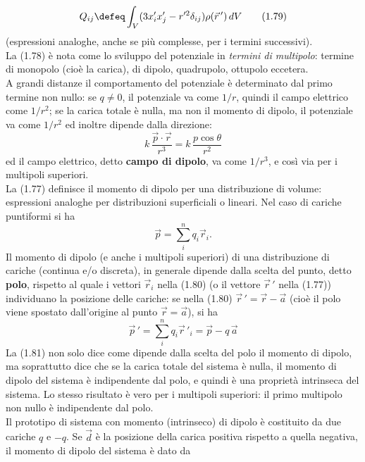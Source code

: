 \begin{equation}
  Q_{ij}\defeq\int_V(3x'_ix'_j-r'^2\delta_{ij})\rho(\vec r\,')\,dV
  \tag{1.79}
\end{equation}
(espressioni analoghe, anche se pi\`u complesse, per i termini successivi).\\
La (1.78) \`e nota come lo sviluppo del potenziale in \emph{termini di
multipolo}: termine di monopolo (cio\`e la carica), di dipolo, quadrupolo,
ottupolo eccetera.\\
A grandi distanze il comportamento del potenziale \`e determinato dal primo
termine non nullo: se $q\neq0$, il potenziale va come $1/r$, quindi il campo
elettrico come $1/r^2$; se la carica totale \`e nulla, ma non il momento di
dipolo, il potenziale va come $1/r^2$ ed inoltre dipende dalla direzione:
\[
  k\,\frac{\vec p\cdot\vec r}{r^3}=k\,\frac{p\cos\theta}{r^2}
\]
ed il campo elettrico, detto \textbf{campo di dipolo}, va come $1/r^3$, e cos\`i
via per i multipoli superiori.\\
La (1.77) definisce il momento di dipolo per una distribuzione di volume:
espressioni analoghe per distribuzioni superficiali o lineari. Nel caso di
cariche puntiformi si ha
\begin{equation}
  \vec p=\sum_i^nq_i\vec r_i.
  \tag{1.80}
\end{equation}
Il momento di dipolo (e anche i multipoli superiori) di una distribuzione di
cariche (continua e/o discreta), in generale dipende dalla scelta del punto,
detto \textbf{polo}, rispetto al quale i vettori $\vec r_i$ nella (1.80) \big(o
il vettore $\vec r\,'$ nella (1.77)\big) individuano la posizione delle cariche:
se nella (1.80) $\vec r\,'=\vec r-\vec a$ (cio\`e il polo viene spostato
dall'origine al punto $\vec r=\vec a$), si ha
\begin{equation}
  \vec p\,'=\sum_i^nq_i\vec r\,'_i=\vec p-q\,\vec a
  \tag{1.81}
\end{equation}
La (1.81) non solo dice come dipende dalla scelta del polo il momento di dipolo,
ma soprattutto dice che se la carica totale del sistema \`e nulla, il momento di
dipolo del sistema \`e indipendente dal polo, e quindi \`e una propriet\`a
intrinseca del sistema. Lo stesso risultato \`e vero per i multipoli superiori:
il primo multipolo non nullo \`e indipendente dal polo.\\
Il prototipo di sistema con momento (intrinseco) di dipolo \`e costituito da due
cariche $q$ e $-q$. Se $\vec d$ \`e la posizione della carica positiva rispetto
a quella negativa, il momento di dipolo del sistema \`e dato da

